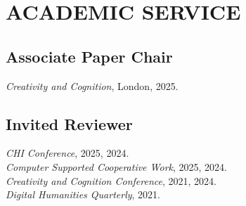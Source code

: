  \section{ACADEMIC SERVICE}

 \subsection{Associate Paper Chair}
  \emph{Creativity and Cognition}, London, 2025.\\
 
  \subsection{Invited Reviewer}
     \emph{CHI Conference}, 2025, 2024. \\
     \emph{Computer Supported Cooperative Work}, 2025, 2024. \\
     \emph{Creativity and Cognition Conference}, 2021, 2024. \\
  \emph{Digital Humanities Quarterly}, 2021. \\
